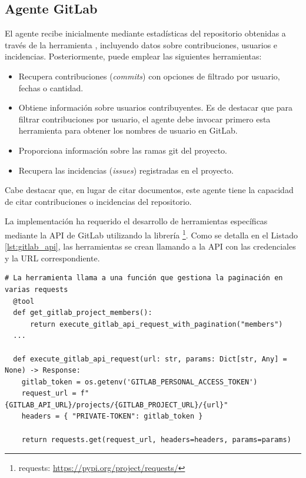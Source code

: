 \subsection{Agente GitLab}
\label{sec:agente_gitlab}
El agente recibe inicialmente mediante  estadísticas del repositorio obtenidas a través de la herramienta , incluyendo datos sobre contribuciones, usuarios e incidencias. Posteriormente, puede emplear las siguientes herramientas:
\begin{itemize}
  \item{} Recupera contribuciones (\textit{commits}) con opciones de filtrado por usuario, fechas o cantidad.
\item{} Obtiene información sobre usuarios contribuyentes. Es de destacar que para filtrar contribuciones por usuario, el agente debe invocar primero esta herramienta para obtener los nombres de usuario en GitLab.
\item{} Proporciona información sobre las ramas git del proyecto.
\item{} Recupera las incidencias (\textit{issues}) registradas en el proyecto.
\end{itemize}
Cabe destacar que, en lugar de citar documentos, este agente tiene la capacidad de citar contribuciones o incidencias del repositorio.

La implementación ha requerido el desarrollo de herramientas específicas mediante la API de GitLab utilizando la librería \footnote{requests: \url{https://pypi.org/project/requests/}}. Como se detalla en el Listado \ref{lst:gitlab_api}, las herramientas se crean llamando a la API con las credenciales y la URL correspondiente.

\begin{lstlisting}[caption={Ejemplo de herramienta para agente GitLab directamente desde la API},label={lst:gitlab_api}]
  # La herramienta llama a una función que gestiona la paginación en varias requests 
  @tool
  def get_gitlab_project_members():
      return execute_gitlab_api_request_with_pagination("members")
  ...

  def execute_gitlab_api_request(url: str, params: Dict[str, Any] = None) -> Response:
    gitlab_token = os.getenv('GITLAB_PERSONAL_ACCESS_TOKEN')
    request_url = f"{GITLAB_API_URL}/projects/{GITLAB_PROJECT_URL}/{url}"
    headers = { "PRIVATE-TOKEN": gitlab_token }

    return requests.get(request_url, headers=headers, params=params)
\end{lstlisting}



















